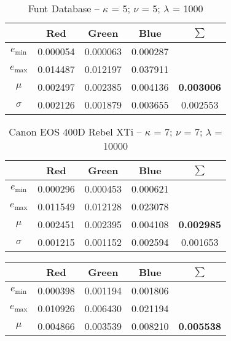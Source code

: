 \begin{appendix}
\begin{table}[htb]
  \label{tab:Sony CyberShot DSC-W300551000}
\end{table}
\begin{table}[htb]
  \centering
    \begin{tabular}{|c||c|c|c|c|}\hline
		   & \textbf{Red} & \textbf{Green} & \textbf{Blue} & \textbf{$\sum$} \\\hline\hline
      $e_\text{min}$ & 0.000054 & 0.000063 & 0.000287 &   \\\hline
      $e_\text{max}$ & 0.014487 & 0.012197 & 0.037911 &   \\\hline
      $\mu$          & 0.002497 & 0.002385 & 0.004136 & \textbf{0.003006} \\\hline
      $\sigma$       & 0.002126 & 0.001879 & 0.003655 & 0.002553 \\\hline
    \end{tabular}
  \caption{Funt Database -- $\kappa$ = 5; $\nu$ = 5; $\lambda$ = 1000}
  \label{tab:Funt Database551000}
\end{table}
\begin{table}[htb]
  \centering
    \begin{tabular}{|c||c|c|c|c|}\hline
		   & \textbf{Red} & \textbf{Green} & \textbf{Blue} & \textbf{$\sum$} \\\hline\hline
      $e_\text{min}$ & 0.000296 & 0.000453 & 0.000621 &   \\\hline
      $e_\text{max}$ & 0.011549 & 0.012128 & 0.023078 &   \\\hline
      $\mu$          & 0.002451 & 0.002395 & 0.004108 & \textbf{0.002985} \\\hline
      $\sigma$       & 0.001215 & 0.001152 & 0.002594 & 0.001653 \\\hline
    \end{tabular}
  \caption{Canon EOS 400D Rebel XTi -- $\kappa$ = 7; $\nu$ = 7; $\lambda$ = 10000}
  \label{tab:Canon EOS 400D Rebel XTi7710000}
\end{table}
\begin{table}[htb]
  \centering
    \begin{tabular}{|c||c|c|c|c|}\hline
		   & \textbf{Red} & \textbf{Green} & \textbf{Blue} & \textbf{$\sum$} \\\hline\hline
      $e_\text{min}$ & 0.000398 & 0.001194 & 0.001806 &   \\\hline
      $e_\text{max}$ & 0.010926 & 0.006430 & 0.021194 &   \\\hline
      $\mu$          & 0.004866 & 0.003539 & 0.008210 & \textbf{0.005538} \\\hline

\end{tabular}
\end{table}
\end{appendix}
